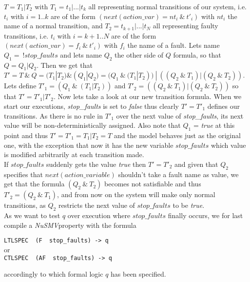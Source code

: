 \documentclass[12pt]{article}
\newcommand{\nusmv}{\mbox{\textit{NuSMV}}}
\begin{document}
$T = T_1 | T_2$ with $T_1 = t_1 | ... | t_k$ all representing normal transitions of our system, i.e. $t_i$ with $i=1..k$ are of the form $(next(action\_var) = nt_i~\&~t'_i)$ with $nt_i$ the name of a normal transition, and $T_2 = t_{k+1} | ... | t_N$ all representing faulty transitions, i.e. $t_i$ with $i=k+1..N$ are of the form $(next(action\_var) = f_i~\&~t'_i)$ with $f_i$ the name of a fault. Lets name $Q_1 =~!stop\_faults$ and lets name $Q_2$ the other side of $Q$ formula, so that $Q = Q_1 | Q_2$.
Then we get that $T' = T ~\&~ Q = (T_1|T_2) \& (Q_1|Q_2) = (Q_1~\&~(T_1|T_2)) ~|~ ((Q_2~\&~T_1) | (Q_2~\&~T_2))$. Lets define $T'_1 = (Q_1~\&~(T_1|T_2))$ and $T'_2 = ((Q_2~\&~T_1) | (Q_2~\&~T_2))$ so that $T' = T'_1 | T'_2$. Now lets take a look at our new transition formula. When we start our executions, \textit{stop\_faults} is set to \textit{false} thus clearly $T' = T'_1$ defines our transitions. As there is no rule in $T'_1$ over the next value of \textit{stop\_faults}, its next value will be non-deterministically assigned. Also note that $Q_1$ = \textit{true} at this point and thus $T' = T'_1 = T_1 | T_2 = T$ and the model behaves just as the original one, with the exception that now it has the new variable $stop\_faults$ which value is modified arbitrarily at each transition made.\\
If $stop\_faults$ suddenly gets the value \textit{true} then $T' = T'_2$ and given that $Q_2$ specifies that $next(action\_variable)$ shouldn't take a fault name as value, we get that the formula $(Q_2~\&~ T_2)$ becomes not satisfiable and thus $T'_2 = (Q_2 ~\&~ T_1)$, and from now on the system will make only normal transitions, as $Q_2$ restricts the next value of $stop\_faults$ to be \textit{true}.\\
As we want to test $q$ over execution where $stop\_faults$ finally occurs, we for last compile a \nusmv property with the formula
\begin{center}
\texttt{LTLSPEC~ (F ~stop\_faults) -> q}\\
or\\
\texttt{CTLSPEC ~(AF~ stop\_faults) -> q}
\end{center} 
accordingly to which formal logic $q$ has been specified.
\end{document}
